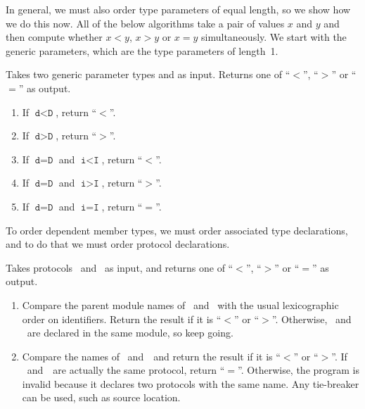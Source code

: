 \documentclass[../generics]{subfiles}
\begin{document}
In general, we must also order type parameters of equal length, so we show how we do this now. All of the below algorithms take a pair of values $x$ and $y$ and then compute whether $x<y$, $x>y$ or $x=y$ simultaneously. We start with the generic parameters, which are the type parameters of length~1.

\begin{algorithm}\label{generic parameter order} Takes two generic parameter types  and  as input. Returns one of ``$<$'', ``$>$'' or ``$=$'' as output.
\begin{enumerate}
\item If $\texttt{d}<\texttt{D}$, return ``$<$''.
\item If $\texttt{d}>\texttt{D}$, return ``$>$''.
\item If $\texttt{d}=\texttt{D}$ and $\texttt{i}<\texttt{I}$, return ``$<$''.
\item If $\texttt{d}=\texttt{D}$ and $\texttt{i}>\texttt{I}$, return ``$>$''.
\item If $\texttt{d}=\texttt{D}$ and $\texttt{i}=\texttt{I}$, return ``$=$''.
\end{enumerate}
\end{algorithm}

To order dependent member types, we must order associated type declarations, and to do that we must order protocol declarations.

\begin{algorithm}\label{linear protocol order} Takes protocols \tP\ and \tQ\ as input, and returns one of ``$<$'', ``$>$'' or ``$=$'' as output.
\begin{enumerate}
\item Compare the parent module names of \tP\ and \tQ\ with the usual lexicographic order on identifiers. Return the result if it is ``$<$'' or ``$>$''. Otherwise, \tP\ and \tQ\ are declared in the same module, so keep going.
\item Compare the names of \tP\ and~\tQ\ and return the result if it is ``$<$'' or ``$>$''. If \tP~and~\tQ\ are actually the same protocol, return ``$=$''. Otherwise, the program is invalid because it declares two protocols with the same name. Any tie-breaker can be used, such as source location.
\end{enumerate}
\end{algorithm}
\end{document}
